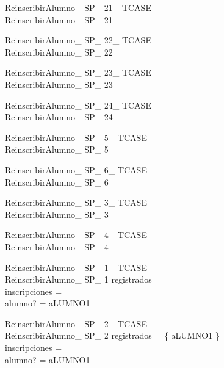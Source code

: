 \documentclass{article}
\begin{document}
\begin{schema}{ReinscribirAlumno\_ SP\_ 21\_ TCASE}\\
 ReinscribirAlumno\_ SP\_ 21
\end{schema}


\begin{schema}{ReinscribirAlumno\_ SP\_ 22\_ TCASE}\\
 ReinscribirAlumno\_ SP\_ 22
\end{schema}


\begin{schema}{ReinscribirAlumno\_ SP\_ 23\_ TCASE}\\
 ReinscribirAlumno\_ SP\_ 23
\end{schema}


\begin{schema}{ReinscribirAlumno\_ SP\_ 24\_ TCASE}\\
 ReinscribirAlumno\_ SP\_ 24
\end{schema}


\begin{schema}{ReinscribirAlumno\_ SP\_ 5\_ TCASE}\\
 ReinscribirAlumno\_ SP\_ 5
\end{schema}


\begin{schema}{ReinscribirAlumno\_ SP\_ 6\_ TCASE}\\
 ReinscribirAlumno\_ SP\_ 6
\end{schema}


\begin{schema}{ReinscribirAlumno\_ SP\_ 3\_ TCASE}\\
 ReinscribirAlumno\_ SP\_ 3
\end{schema}


\begin{schema}{ReinscribirAlumno\_ SP\_ 4\_ TCASE}\\
 ReinscribirAlumno\_ SP\_ 4
\end{schema}


\begin{schema}{ReinscribirAlumno\_ SP\_ 1\_ TCASE}\\
 ReinscribirAlumno\_ SP\_ 1 
\where
 registrados =~\emptyset \\
 inscripciones =~\emptyset \\
 alumno? = aLUMNO1
\end{schema}


\begin{schema}{ReinscribirAlumno\_ SP\_ 2\_ TCASE}\\
 ReinscribirAlumno\_ SP\_ 2 
\where
 registrados = \{ aLUMNO1 \} \\
 inscripciones =~\emptyset \\
 alumno? = aLUMNO1
\end{schema}
\end{document}
